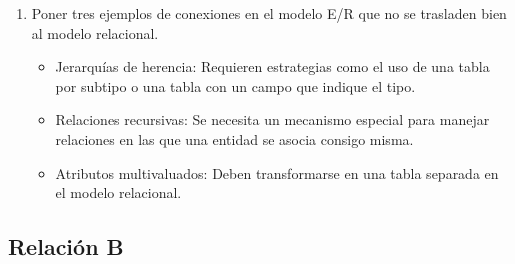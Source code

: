 \begin{enumerate}[label=\textbf{\arabic*.}, itemsep=0.5em]
    \item Poner tres ejemplos de conexiones en el modelo E/R que no se trasladen bien al modelo relacional.  
    \begin{itemize}
        \item Jerarquías de herencia: Requieren estrategias como el uso de una tabla por subtipo o una tabla con un campo que indique el tipo.
        \item Relaciones recursivas: Se necesita un mecanismo especial para manejar relaciones en las que una entidad se asocia consigo misma.
        \item Atributos multivaluados: Deben transformarse en una tabla separada en el modelo relacional.
    \end{itemize}

\end{enumerate}

\subsection{Relación B}


